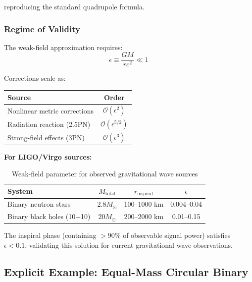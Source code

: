 \documentclass[11pt,a4paper]{article}
\theoremstyle{definition}
\theoremstyle{remark}
\begin{document}
	reproducing the standard quadrupole formula.
	
	\subsubsection{Regime of Validity}
	
	The weak-field approximation requires:
	\begin{equation}
		\epsilon \equiv \frac{GM}{rc^2} \ll 1
	\end{equation}
	
	Corrections scale as:
	
	\begin{table}[h]
		\centering
		\begin{tabular}{lc}
			\toprule
			Source & Order \\
			\midrule
			Nonlinear metric corrections & $\mathcal{O}(\epsilon^2)$ \\
			Radiation reaction (2.5PN) & $\mathcal{O}(\epsilon^{5/2})$ \\
			Strong-field effects (3PN) & $\mathcal{O}(\epsilon^3)$ \\
			\bottomrule
		\end{tabular}
	\end{table}
	
	\textbf{For LIGO/Virgo sources:}
	
	\begin{table}[h]
		\centering
		\begin{tabular}{lccc}
			\toprule
			System & $M_{\text{total}}$ & $r_{\text{inspiral}}$ & $\epsilon$ \\
			\midrule
			Binary neutron stars & $2.8M_\odot$ & 100--1000 km & 0.004--0.04 \\
			Binary black holes (10+10) & $20M_\odot$ & 200--2000 km & 0.01--0.15 \\
			\bottomrule
		\end{tabular}
		\caption{Weak-field parameter for observed gravitational wave sources}
		\label{tab:ligo_epsilon}
	\end{table}
	
	The inspiral phase (containing $>90\%$ of observable signal power) satisfies $\epsilon < 0.1$, validating this solution for current gravitational wave observations.
	
	\subsection{Explicit Example: Equal-Mass Circular Binary}
	
\end{document}
